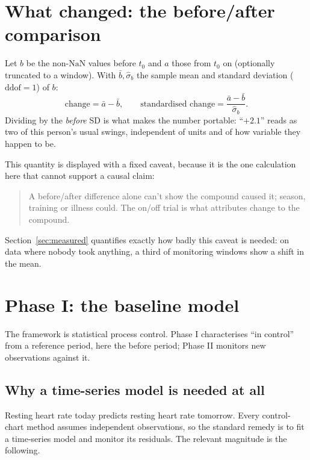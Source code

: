 \documentclass{article}
\theoremstyle{plain}
\theoremstyle{definition}
\theoremstyle{remark}
\numberwithin{equation}{section}
\begin{document}
\section{What changed: the before/after comparison}
\label{sec:ba}

Let $b$ be the non-$\mathrm{NaN}$ values before $t_0$ and $a$ those from $t_0$
on (optionally truncated to a window). With $\bar b, \hat\sigma_b$ the sample
mean and standard deviation ($\mathrm{ddof}=1$) of $b$:
\[
  \text{change} = \bar a - \bar b,
  \qquad
  \text{standardised change} = \frac{\bar a - \bar b}{\hat\sigma_b}.
\]
Dividing by the \emph{before} SD is what makes the number portable: ``$+2.1$''
reads as two of this person's usual swings, independent of units and of how
variable they happen to be.

This quantity is displayed with a fixed caveat, because it is the one
calculation here that cannot support a causal claim:

\begin{quote}
A before/after difference alone can't show the compound caused it; season,
training or illness could. The on/off trial is what attributes change to the
compound.
\end{quote}

Section~\ref{sec:measured} quantifies exactly how badly this caveat is needed:
on data where nobody took anything, a third of monitoring windows show a shift
in the mean.

\section{Phase I: the baseline model}
\label{sec:baseline}

The framework is statistical process control. Phase I characterises ``in
control'' from a reference period, here the before period; Phase II monitors
new observations against it.

\subsection{Why a time-series model is needed at all}

Resting heart rate today predicts resting heart rate tomorrow. Every
control-chart method assumes independent observations, so the standard remedy
is to fit a time-series model and monitor its residuals. The relevant
magnitude is the following.
\end{document}
